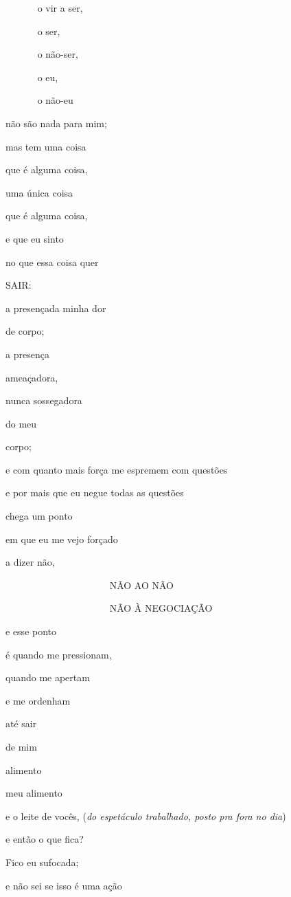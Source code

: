 ~~~~~~ o vir a ser,

~~~~~~ o ser, 

~~~~~~ o não-ser, 

~~~~~~ o eu, 

~~~~~~ o não-eu

não são nada para mim;

mas tem uma coisa

que é alguma coisa,

uma única coisa

que é alguma coisa,

e que eu sinto

no que essa coisa quer

SAIR:

a presençada minha dor

de corpo;

a presença

ameaçadora,

nunca sossegadora

do meu

corpo;


e com quanto mais força me espremem com questões

e por mais que eu negue todas as questões

chega um ponto

em que eu me vejo forçado \EP[3]

a dizer não,

~~~~~~~~~~~~~~~~~~~~~ NÃO AO NÃO

~~~~~~~~~~~~~~~~~~~~~ NÃO À NEGOCIAÇÃO

e esse ponto

é quando me pressionam,

quando me apertam

e me ordenham

até sair

de mim

alimento

meu alimento

e o leite de vocês, (\emph{do espetáculo trabalhado, posto pra fora no dia})

e então o que fica?

Fico eu sufocada;

e não sei se isso é uma ação


